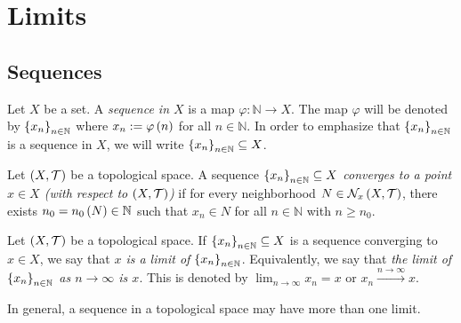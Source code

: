 \chapter{Limits}

\section{Sequences}

\begin{definition}
  Let $X$ be a set. A \textit{sequence in $X$} is a map $\varphi:\mathbb{N}\rightarrow X$. The map $\varphi$ will be denoted by $\left\{x_n\right\}_{n\in\mathbb{N}}$ where $x_n:=\varphi\left(n\right)$ for all $n\in\mathbb{N}$. In order to emphasize that $\left\{x_n\right\}_{n\in\mathbb{N}}$ is a sequence in $X$, we will write $\left\{x_n\right\}_{n\in\mathbb{N}}\subseteq X$.
\end{definition}

\begin{definition}
  Let $\left(X,\mathcal{T}\right)$ be a topological space. A sequence \emph{$\left\{x_n\right\}_{n\in\mathbb{N}}\subseteq X$ converges to a point $x\in X$ (with respect to $\left(X,\mathcal{T}\right)$)} if for every neighborhood $N\in\mathcal{N}_x\left(X,\mathcal{T}\right)$, there exists $n_0=n_0\left(N\right)\in\mathbb{N}$ such that $x_n\in N$ for all $n\in\mathbb{N}$ with $n\geq n_0$. 
\end{definition}

\begin{remark}
  Let $\left(X,\mathcal{T}\right)$ be a topological space. If \emph{$\left\{x_n\right\}_{n\in\mathbb{N}}\subseteq X$} is a sequence converging to $x\in X$, we say that \textit{$x$ is a limit of $\left\{x_n\right\}_{n\in\mathbb{N}}$}. Equivalently, we say that \emph{the limit of $\left\{x_n\right\}_{n\in\mathbb{N}}$ as $n\to\infty$ is $x$}. This is denoted by $\lim_{n\to\infty}{x_n}=x$ or $x_n\stackrel{n\to\infty}{\rightarrow}x$. 
  
  In general, a sequence in a topological space may have more than one limit.
\end{remark}


